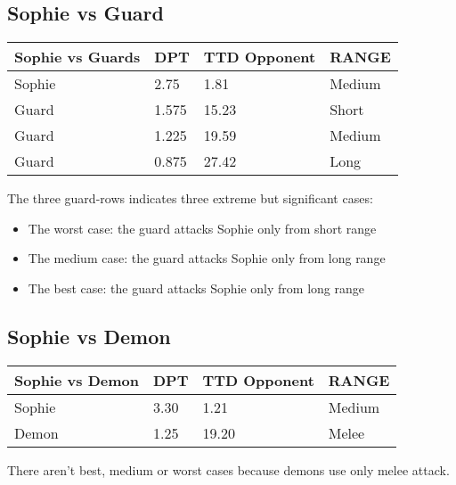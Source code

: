 \subsection{Sophie vs Guard}
\begin{table}[H]
  \centering
\begin{tabular}{|l|l|l|l|}
\hline
\rowcolor[HTML]{C0C0C0} 
\textbf{Sophie vs Guards} & \textbf{DPT} & \textbf{TTD Opponent} & \textbf{RANGE} \\ \hline
Sophie & 2.75 & 1.81 & Medium \\ \hline
Guard & 1.575 & 15.23 & Short \\ \hline
Guard & 1.225 & 19.59 & Medium \\ \hline
Guard & 0.875 & 27.42 & Long \\ \hline
\end{tabular}
\end{table}
The three guard-rows indicates three extreme but significant cases:
\begin{itemize}
\item The worst case: the guard attacks Sophie only from short range
\item The medium case: the guard attacks Sophie only from long range
\item The best case: the guard attacks Sophie only from long range
\end{itemize}

\subsection{Sophie vs Demon}
\begin{table}[H]
  \centering
\begin{tabular}{|l|l|l|l|}
\hline
\rowcolor[HTML]{C0C0C0} 
\textbf{Sophie vs Demon} & \textbf{DPT} & \textbf{TTD Opponent} & \textbf{RANGE} \\ \hline
Sophie & 3.30 & 1.21 & Medium \\ \hline
Demon & 1.25 & 19.20 & Melee \\ \hline
\end{tabular}
\end{table}
There aren't best, medium or worst cases because demons use only melee attack.

